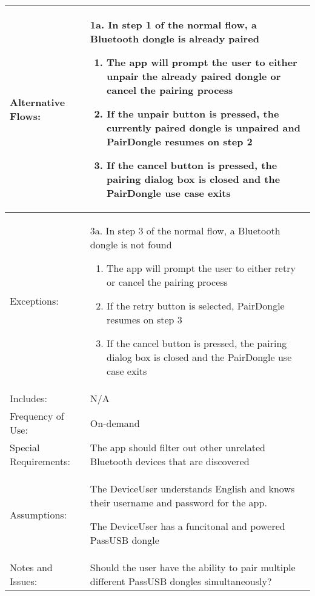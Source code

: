 \documentclass[stu]{apa7}
\newcommand{\nextitem}{\par\hspace*{\labelsep}\textbullet\hspace*{\labelsep}}
\newcommand{\nextitemblank}{\par\hspace*{\labelsep}\hspace*{\labelsep}}
\begin{document}
{\begin{xltabular}{\textwidth}{|l|X|}
  Alternative Flows: & 1a. In step 1 of the normal flow, a Bluetooth dongle is already paired 
    \begin{enumerate}
      \item The app will prompt the user to either unpair the already paired dongle or cancel the pairing process
      \item If the unpair button is pressed, the currently paired dongle is unpaired and PairDongle resumes on step 2
      \item If the cancel button is pressed, the pairing dialog box is closed and the PairDongle use case exits
    \end{enumerate} \\ \hline
  Exceptions: & \nextitemblank 3a. In step 3 of the normal flow, a Bluetooth dongle is not found  
    \begin{enumerate}
      \item The app will prompt the user to either retry or cancel the pairing process 
      \item If the retry button is selected, PairDongle resumes on step 3 
      \item If the cancel button is pressed, the pairing dialog box is closed and the PairDongle use case exits
    \end{enumerate} \\ \hline

  Includes: & N/A \\ \hline

  Frequency of Use: & On-demand \\ \hline

  Special Requirements: & \nextitem The app should filter out other unrelated Bluetooth devices that are discovered \\ \hline

  Assumptions: & \nextitem The DeviceUser understands English and knows their username and password for the app. \nextitem The DeviceUser has a funcitonal and powered PassUSB dongle \\ \hline

  Notes and Issues: & \nextitem Should the user have the ability to pair multiple different PassUSB dongles simultaneously? \\ \hline

\end{xltabular}}
\end{document}
